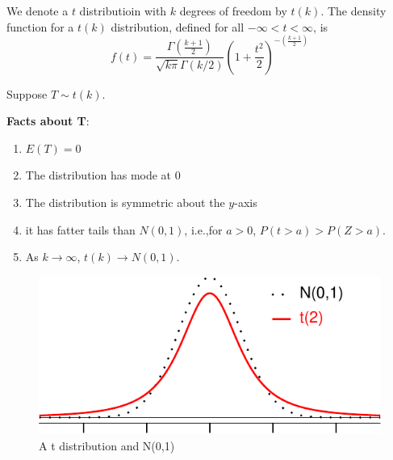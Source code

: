 \documentclass[
]{book}
\providecommand{\tightlist}{%
  \setlength{\itemsep}{0pt}\setlength{\parskip}{0pt}}
\theoremstyle{definition}
\theoremstyle{definition}
\theoremstyle{definition}
\theoremstyle{definition}
\theoremstyle{remark}
\begin{document}
We denote a \(t\) distributioin with \(k\) degrees of freedom by \(t(k)\). The density function for a \(t(k)\) distribution, defined for all \(-\infty < t < \infty\), is
\[f(t) = \frac{\Gamma(\frac{k+1}{2})}{\sqrt{k\pi}\Gamma(k/2)}\left(1+\frac{t^2}{2}\right)^{-\left(\frac{k+1}{2}\right)}\]

Suppose \(T \sim t(k)\).

\textbf{Facts about T}:

\begin{enumerate}
\def\labelenumi{\arabic{enumi}.}
\tightlist
\item
  \(E(T) = 0\)
\item
  The distribution has mode at 0
\item
  The distribution is symmetric about the \(y\)-axis
\item
  it has fatter tails than \(N(0,1)\), i.e.,for \(a > 0\), \(P(t > a) > P(Z > a)\).
\item
  As \(k \to \infty\), \(t(k) \to N(0,1)\).
\end{enumerate}

\begin{figure}
\centering
\includegraphics{math340-notes_files/figure-latex/t-vs-st-norm-1.pdf}
\caption{\label{fig:t-vs-st-norm}A t distribution and N(0,1)}
\end{figure}
\end{document}
